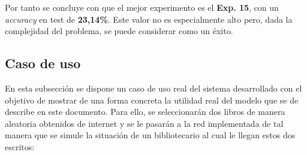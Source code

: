 \documentclass[12pt,a4paper, xcolor=table]{article}
\begin{document}
Por tanto se concluye con que el mejor experimento es el \textbf{Exp. 15}, con un \textit{accuracy} en test de \textbf{23,14\%}. Este valor no es especialmente alto pero, dada la complejidad del problema, se puede considerar como un éxito.

\subsection{Caso de uso}
En esta subsección se dispone un caso de uso real del sistema desarrollado con el objetivo de mostrar de una forma concreta la utilidad real del modelo que se de describe en este documento. Para ello, se seleccionarán dos libros de manera aleatoria obtenidos de internet y se le pasarán a la red implementada de tal manera que se simule la situación de un bibliotecario al cual le llegan estos dos escritos: 
\end{document}
